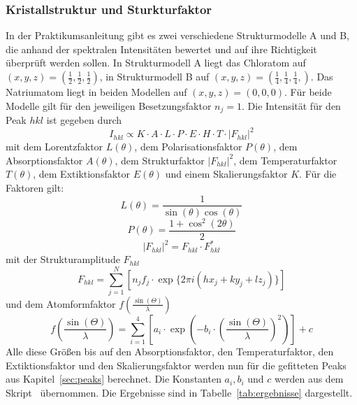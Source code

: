 \subsubsection{Kristallstruktur und Sturkturfaktor}
\label{sec:kristallstruktur}

In der Praktikumsanleitung gibt es zwei verschiedene Strukturmodelle A und B, die anhand der spektralen Intensitäten bewertet und auf ihre Richtigkeit überprüft werden sollen.
In Strukturmodell A liegt das Chloratom auf $(x,y,z) = (\frac{1}{2}, \frac{1}{2}, \frac{1}{2})$, in Strukturmodell B auf $(x,y,z) = (\frac{1}{4},\frac{1}{4},\frac{1}{4},)$. Das Natriumatom liegt in beiden Modellen auf $(x,y,z) = (0,0,0)$. Für beide Modelle gilt für den jeweiligen Besetzungsfaktor $n_j = 1$. Die Intensität für den Peak $hkl$ ist gegeben durch
\begin{equation}
    I_{hkl} \propto K \cdot A \cdot L \cdot P \cdot E \cdot H \cdot T \cdot \left|F_{hkl}\right|^2
\end{equation}
mit dem Lorentzfaktor $L(\theta)$, dem Polarisationsfaktor $P(\theta)$, dem Absorptionsfaktor $A(\theta)$, dem Strukturfaktor $\left|F_{hkl}\right|^2$, dem Temperaturfaktor $T(\theta)$, dem Extiktionsfaktor $E(\theta)$ und einem Skalierungsfaktor $K$. Für die Faktoren gilt:
\begin{equation}
    L (\theta)= \frac{1}{\sin(\theta) \cos(\theta)}
\end{equation}
\begin{equation}
    P (\theta) = \frac{1 + \cos^2(2\theta)}{2}
\end{equation}
\begin{equation}
    \left|F_{hkl}\right|^2 = F_{hkl} \cdot F_{hkl}^*
\end{equation}
mit der Strukturamplitude $F_{hkl}$
\begin{equation}
    F_{hkl} = \sum_{j = 1}^{N} \left[n_j f_j \cdot \exp \{2\pi i \left(hx_j+ky_j+lz_j\right)\}\right]
\end{equation}
und dem Atomformfaktor $f\left(\frac{\sin\left(\Theta\right)}{\lambda}\right)$
\begin{equation}
    f\left(\frac{\sin\left(\Theta\right)}{\lambda}\right) = \sum_{i=1}^4 \left[a_i \cdot \exp\left(-b_i \cdot \left(\frac{\sin(\Theta)}{\lambda}\right)^2\right)\right] + c
\end{equation}
Alle diese Größen bis auf den Absorptionsfaktor, den Temperaturfaktor, den Extiktionsfaktor und den Skalierungsfaktor werden nun für die gefitteten Peaks aus Kapitel~\ref{sec:peaks} berechnet. Die Konstanten $a_i, b_i$ und $c$ werden aus dem Skript~\cite[]{Anleitung} übernommen. Die Ergebnisse sind in Tabelle~\ref{tab:ergebnisse} dargestellt.
